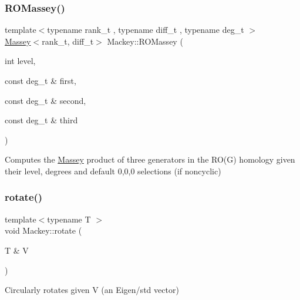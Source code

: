 \subsubsection{\texorpdfstring{R\+O\+Massey()}{ROMassey()}\hspace{0.1cm}{\footnotesize\ttfamily [2/2]}}
{\footnotesize\ttfamily template$<$typename rank\+\_\+t , typename diff\+\_\+t , typename deg\+\_\+t $>$ \\
\hyperlink{classMackey_1_1Massey}{Massey}$<$rank\+\_\+t, diff\+\_\+t$>$ Mackey\+::\+R\+O\+Massey (\begin{DoxyParamCaption}\item[{int}]{level,  }\item[{const deg\+\_\+t \&}]{first,  }\item[{const deg\+\_\+t \&}]{second,  }\item[{const deg\+\_\+t \&}]{third }\end{DoxyParamCaption})\hspace{0.3cm}{\ttfamily [inline]}}



Computes the \hyperlink{classMackey_1_1Massey}{Massey} product of three generators in the R\+O(\+G) homology given their level, degrees and default 0,0,0 selections (if noncyclic) 

\mbox{\label{namespaceMackey_a38a833de54971845cbdb8c96f830725b}} 
\subsubsection{\texorpdfstring{rotate()}{rotate()}}
{\footnotesize\ttfamily template$<$typename T $>$ \\
void Mackey\+::rotate (\begin{DoxyParamCaption}\item[{T \&}]{V }\end{DoxyParamCaption})}



Circularly rotates given V (an Eigen/std vector) 


